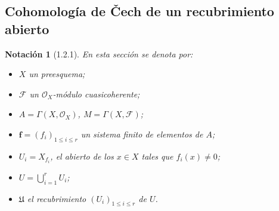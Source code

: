 \documentclass[10pt,oneside,openany]{book}
\theoremstyle{egaenv}\newtheorem*{env}{---}
\theoremstyle{egastatement}
\theoremstyle{egadescription}
\newtheorem*{notation}{Notación}
\newcommand{\oldpage}[2][]{\marginnote{\normalfont\scriptsize\textbf{#1}\,|\,#2}\ignorespaces}
\renewcommand{\leq}{\leqslant}
\begin{document}
\subsection{Cohomología de \v Cech de un recubrimiento abierto}
\label{subsection:III.1.2}
\label{subsection:III.1.2-fr}

\begin{notation}[1.2.1]
\label{III.1.2.1}
\label{III.1.2.1-fr}
En esta sección se denota por:
\begin{itemize}
  \item $X$ un preesquema;
  \item $\mathcal F$ un $\mathcal O_X$-módulo cuasicoherente;
\oldpage[III]{86}
  \item $A=\Gamma(X,\mathcal O_X)$, $M=\Gamma(X,\mathcal F)$;
  \item $\mathbf f=(f_i)_{1\leq i\leq r}$ un sistema finito de elementos de $A$;
  \item $U_i=X_{f_i}$, el abierto  de los $x\in X$ tales que $f_i(x)\neq0$;
  \item $U=\bigcup_{i=1}^r U_i$;
  \item $\mathfrak U$ el recubrimiento $(U_i)_{1\leq i\leq r}$ de $U$.
\end{itemize}
\end{notation}
\end{document}
